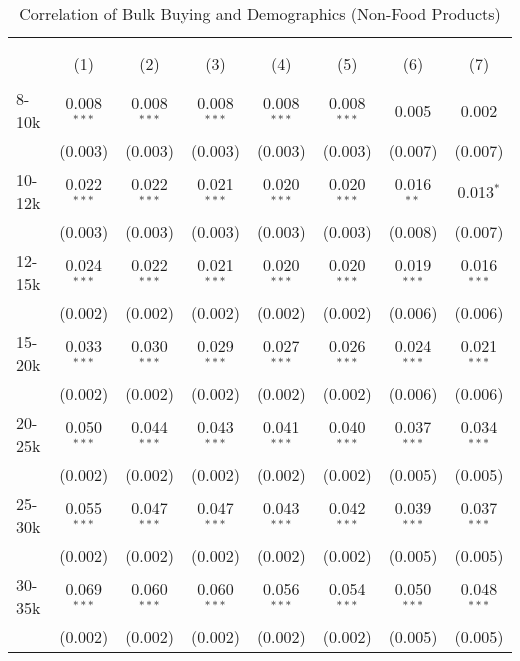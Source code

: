 
\begin{table}[!htbp] \centering 
  \caption{Correlation of Bulk Buying and Demographics (Non-Food Products)} 
  \label{tab:discountingBehaviorNonFood} 
\begin{tabular}{@{\extracolsep{5pt}}lccccccc} 
\\[-1.8ex]\hline 
\hline \\[-1.8ex] 
\\[-1.8ex] & (1) & (2) & (3) & (4) & (5) & (6) & (7)\\ 
\hline \\[-1.8ex] 
 8-10k & 0.008$^{***}$ & 0.008$^{***}$ & 0.008$^{***}$ & 0.008$^{***}$ & 0.008$^{***}$ & 0.005 & 0.002 \\ 
  & (0.003) & (0.003) & (0.003) & (0.003) & (0.003) & (0.007) & (0.007) \\ 
  10-12k & 0.022$^{***}$ & 0.022$^{***}$ & 0.021$^{***}$ & 0.020$^{***}$ & 0.020$^{***}$ & 0.016$^{**}$ & 0.013$^{*}$ \\ 
  & (0.003) & (0.003) & (0.003) & (0.003) & (0.003) & (0.008) & (0.007) \\ 
  12-15k & 0.024$^{***}$ & 0.022$^{***}$ & 0.021$^{***}$ & 0.020$^{***}$ & 0.020$^{***}$ & 0.019$^{***}$ & 0.016$^{***}$ \\ 
  & (0.002) & (0.002) & (0.002) & (0.002) & (0.002) & (0.006) & (0.006) \\ 
  15-20k & 0.033$^{***}$ & 0.030$^{***}$ & 0.029$^{***}$ & 0.027$^{***}$ & 0.026$^{***}$ & 0.024$^{***}$ & 0.021$^{***}$ \\ 
  & (0.002) & (0.002) & (0.002) & (0.002) & (0.002) & (0.006) & (0.006) \\ 
  20-25k & 0.050$^{***}$ & 0.044$^{***}$ & 0.043$^{***}$ & 0.041$^{***}$ & 0.040$^{***}$ & 0.037$^{***}$ & 0.034$^{***}$ \\ 
  & (0.002) & (0.002) & (0.002) & (0.002) & (0.002) & (0.005) & (0.005) \\ 
  25-30k & 0.055$^{***}$ & 0.047$^{***}$ & 0.047$^{***}$ & 0.043$^{***}$ & 0.042$^{***}$ & 0.039$^{***}$ & 0.037$^{***}$ \\ 
  & (0.002) & (0.002) & (0.002) & (0.002) & (0.002) & (0.005) & (0.005) \\ 
  30-35k & 0.069$^{***}$ & 0.060$^{***}$ & 0.060$^{***}$ & 0.056$^{***}$ & 0.054$^{***}$ & 0.050$^{***}$ & 0.048$^{***}$ \\ 
  & (0.002) & (0.002) & (0.002) & (0.002) & (0.002) & (0.005) & (0.005) \\ 

\end{tabular}
\end{table}
